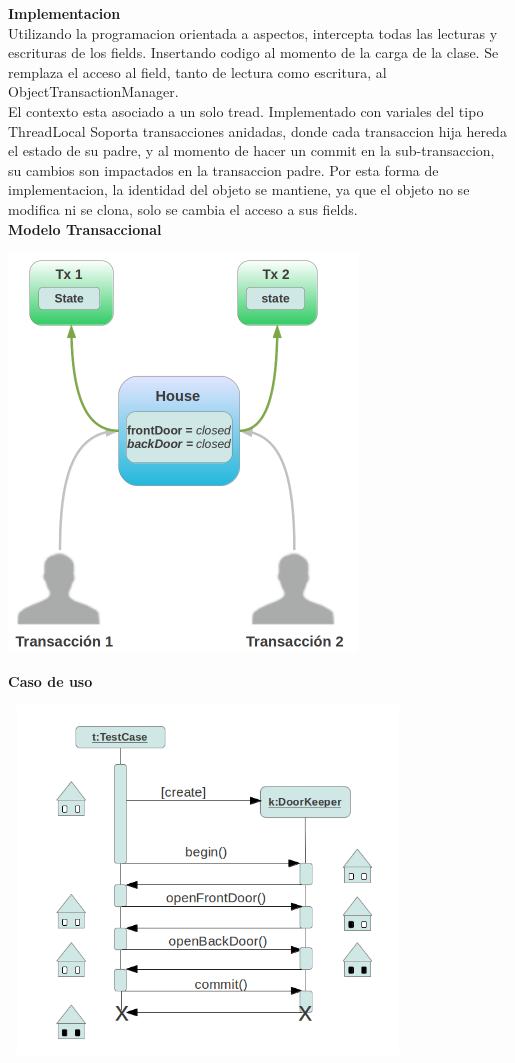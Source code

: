 \begin{enumerate}
	 
	{\bf Implementacion}\\
	Utilizando la programacion orientada a aspectos, intercepta todas las lecturas
	y escrituras de los fields. Insertando codigo al momento de la carga de la
	clase.
	Se remplaza el acceso al field, tanto de lectura como escritura, al
	ObjectTransactionManager.\\
	
	El contexto esta asociado a un solo tread. Implementado con variales del tipo ThreadLocal
	Soporta transacciones anidadas, donde cada transaccion hija hereda el estado
	de su padre, y al momento de hacer un commit en la sub-transaccion, su cambios
	son impactados en la transaccion padre.
	Por esta forma de implementacion, la identidad del objeto se mantiene, ya que
	el objeto no se modifica ni se clona, solo se cambia el acceso a sus fields.\\
	
	{\bf Modelo Transaccional}
	
	\includegraphics[width=350px, height=400px]{img/transacionalModel}
	
	{\bf Caso de uso}
	
	\includegraphics[width=400px, height=350px]{img/tescasePOT}
	

\end{enumerate}
